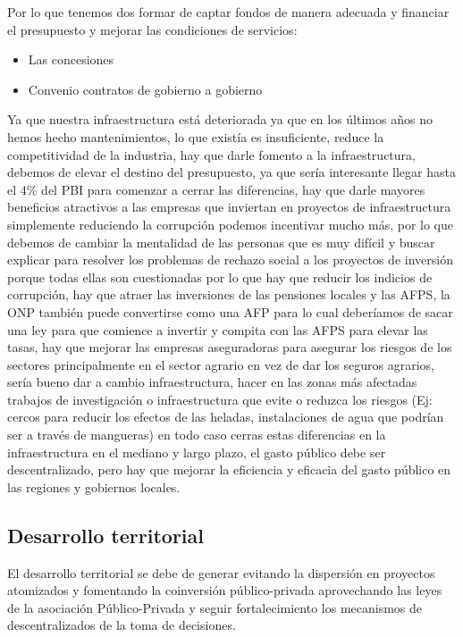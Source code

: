 \documentclass[
  letterpaper,
  DIV=11,
  numbers=noendperiod]{scrartcl}
\providecommand{\tightlist}{%
  \setlength{\itemsep}{0pt}\setlength{\parskip}{0pt}}\usepackage{longtable,booktabs,array}
\begin{document}
Por lo que tenemos dos formar de captar fondos de manera adecuada y
financiar el presupuesto y mejorar las condiciones de servicios:

\begin{itemize}
\tightlist
\item
  Las concesiones
\item
  Convenio contratos de gobierno a gobierno
\end{itemize}

Ya que nuestra infraestructura está deteriorada ya que en los últimos
años no hemos hecho mantenimientos, lo que existía es insuficiente,
reduce la competitividad de la industria, hay que darle fomento a la
infraestructura, debemos de elevar el destino del presupuesto, ya que
sería interesante llegar hasta el 4\% del PBI para comenzar a cerrar las
diferencias, hay que darle mayores beneficios atractivos a las empresas
que inviertan en proyectos de infraestructura simplemente reduciendo la
corrupción podemos incentivar mucho más, por lo que debemos de cambiar
la mentalidad de las personas que es muy difícil y buscar explicar para
resolver los problemas de rechazo social a los proyectos de inversión
porque todas ellas son cuestionadas por lo que hay que reducir los
indicios de corrupción, hay que atraer las inversiones de las pensiones
locales y las AFPS, la ONP también puede convertirse como una AFP para
lo cual deberíamos de sacar una ley para que comience a invertir y
compita con las AFPS para elevar las tasas, hay que mejorar las empresas
aseguradoras para asegurar los riesgos de los sectores principalmente en
el sector agrario en vez de dar los seguros agrarios, sería bueno dar a
cambio infraestructura, hacer en las zonas más afectadas trabajos de
investigación o infraestructura que evite o reduzca los riesgos (Ej:
cercos para reducir los efectos de las heladas, instalaciones de agua
que podrían ser a través de mangueras) en todo caso cerras estas
diferencias en la infraestructura en el mediano y largo plazo, el gasto
público debe ser descentralizado, pero hay que mejorar la eficiencia y
eficacia del gasto público en las regiones y gobiernos locales.

\hypertarget{desarrollo-territorial}{%
\subsection{Desarrollo territorial}\label{desarrollo-territorial}}

El desarrollo territorial se debe de generar evitando la dispersión en
proyectos atomizados y fomentando la coinversión público-privada
aprovechando las leyes de la asociación Público-Privada y seguir
fortalecimiento los mecanismos de descentralizados de la toma de
decisiones.
\end{document}
